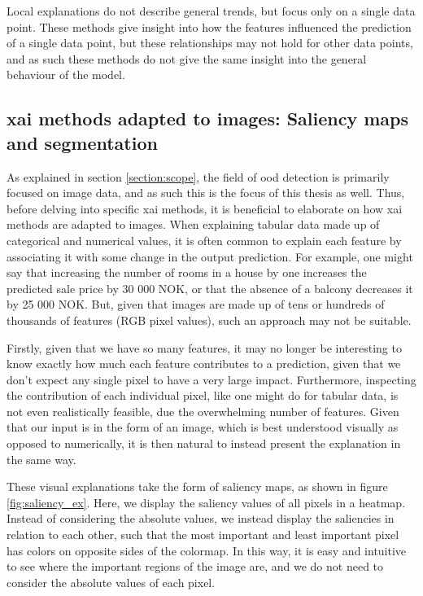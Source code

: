 \documentclass[UKenglish]{uiomasterthesis} %
\theoremstyle{definition}
\begin{document}
Local explanations do not describe general trends, but focus only on a single data point. These methods give insight into how the features influenced the prediction of a single data point, but these relationships may not hold for other data points, and as such these methods do not give the same insight into the general behaviour of the model.

%

\subsection{\ac{xai} methods adapted to images: Saliency maps and segmentation} \label{section:saliencymapbackground}


As explained in section \ref{section:scope}, the field of \ac{ood} detection is primarily focused on image data, and as such this is the focus of this thesis as well. Thus, before delving into specific \ac{xai} methods, it is beneficial to elaborate on how \ac{xai} methods are adapted to images. When explaining tabular data made up of categorical and numerical values, it is often common to explain each feature by associating it with some change in the output prediction. For example, one might say that increasing the number of rooms in a house by one increases the predicted sale price by 30 000 NOK, or that the absence of a balcony decreases it by 25 000 NOK. But, given that images are made up of tens or hundreds of thousands of features (RGB pixel values), such an approach may not be suitable.

Firstly, given that we have so many features, it may no longer be interesting to know exactly how much each feature contributes to a prediction, given that we don't expect any single pixel to have a very large impact. Furthermore, inspecting the contribution of each individual pixel, like one might do for tabular data, is not even realistically feasible, due the overwhelming number of features. Given that our input is in the form of an image, which is best understood visually as opposed to numerically, it is then natural to instead present the explanation in the same way.

These visual explanations take the form of saliency maps, as shown in figure \ref{fig:saliency_ex}. Here, we display the saliency values of all pixels in a heatmap. Instead of considering the absolute values, we instead display the saliencies in relation to each other, such that the most important and least important pixel has colors on opposite sides of the colormap. In this way, it is easy and intuitive to see where the important regions of the image are, and we do not need to consider the absolute values of each pixel.
\end{document}
